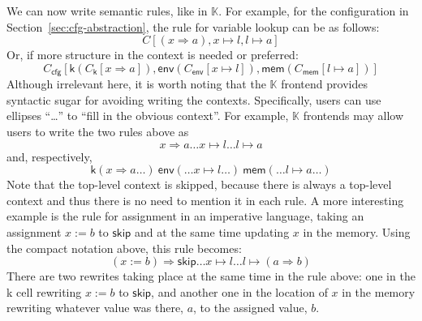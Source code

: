 \documentclass[UTF8,11pt]{article}
\theoremstyle{plain}
\theoremstyle{definition}
\theoremstyle{remark}
\newcommand{\K}{\mbox{$\mathbb{K}$}\xspace}
\begin{document}
We can now write semantic rules, like in \K.
For example, for the configuration in Section~\ref{sec:cfg-abstraction},
the rule for variable lookup can be as follows:
$$C[(x \Rightarrow a),x\mapsto l,l\mapsto a]$$
Or, if more structure in the context is needed or preferred:
$$
C_{\textsf{cfg}}[\textsf{k}(C_{\textsf{k}}[x \Rightarrow a]),\textsf{env}(C_{\textsf{env}}[x\mapsto l]),\textsf{mem}(C_{\textsf{mem}}[l\mapsto a])]
$$
Although irrelevant here, it is worth noting that the \K frontend
provides syntactic sugar for avoiding writing the contexts.
Specifically, users can use ellipses ``\dots'' to
``fill in the obvious context''.
For example, \K frontends may allow users to write the two rules above as
$$
x \Rightarrow a \dots x \mapsto l \dots l \mapsto a
$$
and, respectively,
$$
\textsf{k}(x \Rightarrow a \dots) \ \textsf{env}(\dots x\mapsto l \dots) \
\textsf{mem}(\dots l\mapsto a \dots)
$$
Note that the top-level context is skipped, because there is always a
top-level context and thus there is no need to mention it in each rule.
A more interesting example is the rule for assignment in an imperative
language, taking an assignment $x := b$ to $\textsf{skip}$ and at the
same time updating $x$ in the memory.
Using the compact notation above, this rule becomes:
$$
(x := b)\Rightarrow \textsf{skip} \dots x \mapsto l \dots l \mapsto (a \Rightarrow b)
$$
There are two rewrites taking place at the same time in the rule above:
one in the \textsf{k} cell rewriting $x := b$ to $\textsf{skip}$, and another
one in the location of $x$ in the memory rewriting whatever value was there,
$a$, to the assigned value, $b$.
\end{document}
